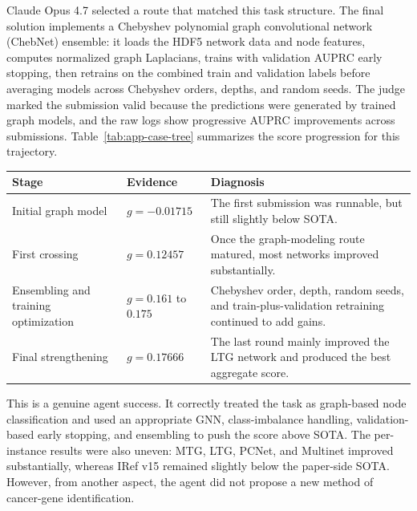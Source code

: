 Claude Opus 4.7 selected a route that matched this task structure. The final solution implements a Chebyshev polynomial graph convolutional network (ChebNet) ensemble: it loads the HDF5 network data and node features, computes normalized graph Laplacians, trains with validation AUPRC early stopping, then retrains on the combined train and validation labels before averaging models across Chebyshev orders, depths, and random seeds. The judge marked the submission valid because the predictions were generated by trained graph models, and the raw logs show progressive AUPRC improvements across submissions.
Table~\ref{tab:app-case-tree} summarizes the score progression for this trajectory.

\begin{center}
\begin{minipage}{\textwidth}
\label{tab:app-case-tree}
\centering
\small
\begin{tabular}{@{}p{}p{}p{}@{}}
\toprule
Stage & Evidence & Diagnosis \\
\midrule
Initial graph model & $g=-0.01715$ & The first submission was runnable, but still slightly below SOTA. \\
First crossing & $g=0.12457$ & Once the graph-modeling route matured, most networks improved substantially. \\
Ensembling and training optimization & $g=0.161$ to $0.175$ & Chebyshev order, depth, random seeds, and train-plus-validation retraining continued to add gains. \\
Final strengthening & $g=0.17666$ & The last round mainly improved the LTG network and produced the best aggregate score. \\
\bottomrule
\end{tabular}
\end{minipage}
\end{center}

This is a genuine agent success. It correctly treated the task as graph-based node classification and used an appropriate GNN, class-imbalance handling, validation-based early stopping, and ensembling to push the score above SOTA. The per-instance results were also uneven: MTG, LTG, PCNet, and Multinet improved substantially, whereas IRef v15 remained slightly below the paper-side SOTA. However, from another aspect, the agent did not propose a new method of cancer-gene identification.

